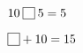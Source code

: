 \documentclass{article}
\newcommand\mybox[3][0pt]
  {\begingroup\fboxsep=-\fboxrule\fbox{\rule{#2}{0pt}\rule[#1]{0pt}{#3}}\endgroup}
\begin{document}
$10\mathbin{\mybox[-2pt]{10pt}{10pt}}5=5$ %

$\mybox[-2pt]{10pt}{10pt}+10=15$
\end{document}
